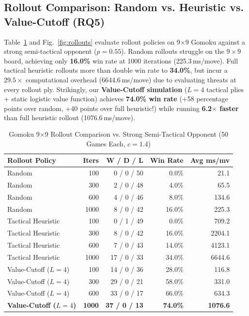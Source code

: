 \documentclass[conference]{IEEEtran}
\begin{document}
\subsection{Rollout Comparison: Random vs. Heuristic vs. Value-Cutoff (RQ5)}
Table~\ref{tab:rollouts} and Fig.~\ref{fig:rollouts} evaluate rollout policies on 9$\times$9 Gomoku against a strong semi-tactical opponent ($p=0.55$). Random rollouts struggle on the $9\times 9$ board, achieving only \textbf{16.0\%} win rate at 1000 iterations (225.3\,ms/move). Full tactical heuristic rollouts more than double win rate to \textbf{34.0\%}, but incur a $29.5\times$ computational overhead (6644.6\,ms/move) due to evaluating threats at every rollout ply. Strikingly, our \textbf{Value-Cutoff simulation} ($L=4$ tactical plies + static logistic value function) achieves \textbf{74.0\% win rate} (+58 percentage points over random, +40 points over full heuristic!) while running \textbf{6.2$\times$ faster} than full heuristic rollout (1076.6\,ms/move).

\begin{table}[t]
\centering
\caption{Gomoku 9$\times$9 Rollout Comparison vs. Strong Semi-Tactical Opponent (50 Games Each, $c=1.4$)}
\label{tab:rollouts}
\begin{tabular}{@{}lrrrr@{}}
\toprule
\textbf{Rollout Policy} & \textbf{Iters} & \textbf{W / D / L} & \textbf{Win Rate} & \textbf{Avg ms/mv} \\
\midrule
Random & 100 & 0 / 0 / 50 & 0.0\% & 21.1 \\
Random & 300 & 2 / 0 / 48 & 4.0\% & 65.5 \\
Random & 600 & 4 / 0 / 46 & 8.0\% & 134.6 \\
Random & 1000 & 8 / 0 / 42 & 16.0\% & 225.3 \\
\midrule
Tactical Heuristic & 100 & 0 / 1 / 49 & 0.0\% & 709.2 \\
Tactical Heuristic & 300 & 8 / 0 / 42 & 16.0\% & 2204.1 \\
Tactical Heuristic & 600 & 7 / 0 / 43 & 14.0\% & 4123.1 \\
Tactical Heuristic & 1000 & 17 / 0 / 33 & 34.0\% & 6644.6 \\
\midrule
Value-Cutoff ($L{=}4$) & 100 & 14 / 0 / 36 & 28.0\% & 116.8 \\
Value-Cutoff ($L{=}4$) & 300 & 29 / 0 / 21 & 58.0\% & 331.0 \\
Value-Cutoff ($L{=}4$) & 600 & 33 / 0 / 17 & 66.0\% & 634.3 \\
\textbf{Value-Cutoff ($L{=}4$)} & \textbf{1000} & \textbf{37 / 0 / 13} & \textbf{74.0\%} & \textbf{1076.6} \\
\bottomrule
\end{tabular}
\end{table}
\end{document}
